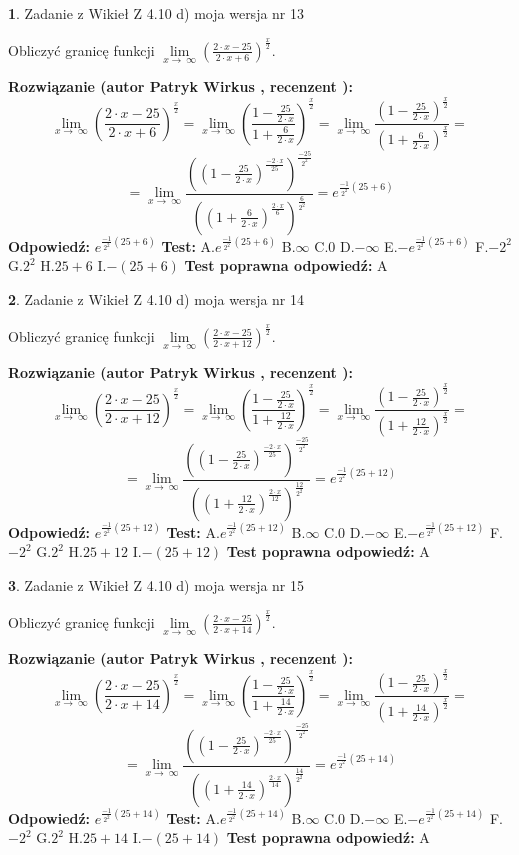 \documentclass[12pt, a4paper]{article}
\theoremstyle{definition} %
\newtheorem{zad}{}
\newcommand{\zadStart}[1]{\begin{zad}#1\newline}
\newcommand{\zadStop}{\end{zad}}
\newcommand{\rozwStart}[2]{\noindent \textbf{Rozwiązanie (autor #1 , recenzent #2): }\newline}
\newcommand{\rozwStop}{\newline}
\newcommand{\odpStart}{\noindent \textbf{Odpowiedź:}\newline}
\newcommand{\odpStop}{\newline}
\newcommand{\testStart}{\noindent \textbf{Test:}\newline}
\newcommand{\testStop}{\newline}
\newcommand{\kluczStart}{\noindent \textbf{Test poprawna odpowiedź:}\newline}
\newcommand{\kluczStop}{\newline}
\begin{document}
\zadStart{Zadanie z Wikieł Z 4.10 d) moja wersja nr 13}


Obliczyć granicę funkcji  $\lim\limits_{x\to\ \infty}(\frac{2\cdot x-25}{2\cdot x+6})^{\frac{x}{2}}$.
\zadStop
\rozwStart{Patryk Wirkus}{}
$$\lim\limits_{x\to\ \infty}(\frac{2\cdot x-25}{2\cdot x+6})^{\frac{x}{2}} = \lim\limits_{x\to\ \infty}(\frac{1-\frac{25}{2\cdot x}}{1+\frac{6}{2\cdot x}})^{\frac{x}{2}}=\lim\limits_{x\to\ \infty}\frac{(1-\frac{25}{2\cdot x})^{\frac{x}{2}}}{(1+\frac{6}{2\cdot x})^{\frac{x}{2}}}=$$
$$=\lim\limits_{x\to\ \infty}\frac{((1-\frac{25}{2\cdot x})^{\frac{-2\cdot x}{25}})^{\frac{-25}{2^{2}}}}{((1+\frac{6}{2\cdot x})^{\frac{2\cdot x}{6}})^{\frac{6}{2^{2}}}}=e^{\frac{-1}{2^{2}}(25+6)}$$
\rozwStop
\odpStart
$e^{\frac{-1}{2^{2}}(25+6)}$
\odpStop
\testStart
A.$e^{\frac{-1}{2^{2}}(25+6)}$ B.$\infty$ C.$0$ D.$-\infty$ E.$-e^{\frac{-1}{2^{2}}(25+6)}$
F.$-2^{2}$ G.$2^{2}$
H.$25+6$
I.$-(25+6)$
\testStop
\kluczStart
A
\kluczStop



\zadStart{Zadanie z Wikieł Z 4.10 d) moja wersja nr 14}


Obliczyć granicę funkcji  $\lim\limits_{x\to\ \infty}(\frac{2\cdot x-25}{2\cdot x+12})^{\frac{x}{2}}$.
\zadStop
\rozwStart{Patryk Wirkus}{}
$$\lim\limits_{x\to\ \infty}(\frac{2\cdot x-25}{2\cdot x+12})^{\frac{x}{2}} = \lim\limits_{x\to\ \infty}(\frac{1-\frac{25}{2\cdot x}}{1+\frac{12}{2\cdot x}})^{\frac{x}{2}}=\lim\limits_{x\to\ \infty}\frac{(1-\frac{25}{2\cdot x})^{\frac{x}{2}}}{(1+\frac{12}{2\cdot x})^{\frac{x}{2}}}=$$
$$=\lim\limits_{x\to\ \infty}\frac{((1-\frac{25}{2\cdot x})^{\frac{-2\cdot x}{25}})^{\frac{-25}{2^{2}}}}{((1+\frac{12}{2\cdot x})^{\frac{2\cdot x}{12}})^{\frac{12}{2^{2}}}}=e^{\frac{-1}{2^{2}}(25+12)}$$
\rozwStop
\odpStart
$e^{\frac{-1}{2^{2}}(25+12)}$
\odpStop
\testStart
A.$e^{\frac{-1}{2^{2}}(25+12)}$ B.$\infty$ C.$0$ D.$-\infty$ E.$-e^{\frac{-1}{2^{2}}(25+12)}$
F.$-2^{2}$ G.$2^{2}$
H.$25+12$
I.$-(25+12)$
\testStop
\kluczStart
A
\kluczStop



\zadStart{Zadanie z Wikieł Z 4.10 d) moja wersja nr 15}


Obliczyć granicę funkcji  $\lim\limits_{x\to\ \infty}(\frac{2\cdot x-25}{2\cdot x+14})^{\frac{x}{2}}$.
\zadStop
\rozwStart{Patryk Wirkus}{}
$$\lim\limits_{x\to\ \infty}(\frac{2\cdot x-25}{2\cdot x+14})^{\frac{x}{2}} = \lim\limits_{x\to\ \infty}(\frac{1-\frac{25}{2\cdot x}}{1+\frac{14}{2\cdot x}})^{\frac{x}{2}}=\lim\limits_{x\to\ \infty}\frac{(1-\frac{25}{2\cdot x})^{\frac{x}{2}}}{(1+\frac{14}{2\cdot x})^{\frac{x}{2}}}=$$
$$=\lim\limits_{x\to\ \infty}\frac{((1-\frac{25}{2\cdot x})^{\frac{-2\cdot x}{25}})^{\frac{-25}{2^{2}}}}{((1+\frac{14}{2\cdot x})^{\frac{2\cdot x}{14}})^{\frac{14}{2^{2}}}}=e^{\frac{-1}{2^{2}}(25+14)}$$
\rozwStop
\odpStart
$e^{\frac{-1}{2^{2}}(25+14)}$
\odpStop
\testStart
A.$e^{\frac{-1}{2^{2}}(25+14)}$ B.$\infty$ C.$0$ D.$-\infty$ E.$-e^{\frac{-1}{2^{2}}(25+14)}$
F.$-2^{2}$ G.$2^{2}$
H.$25+14$
I.$-(25+14)$
\testStop
\kluczStart
A
\kluczStop
\end{document}

